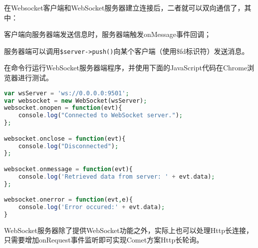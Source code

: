 在Websocket客户端和WebSocket服务器建立连接后，二者就可以双向通信了，其中：

\begin{compactitem}
\item 客户端向服务器端发送信息时，服务器端触发onMessage事件回调；
\item 服务器端可以调用\texttt{\$server->push()}向某个客户端（使用\$fd标识符）发送消息。
\end{compactitem}

在命令行运行WebSocket服务器端程序，并使用下面的JavaScript代码在Chrome浏览器进行测试。

\begin{lstlisting}[language=PHP]
var wsServer = 'ws://0.0.0.0:9501';
var websocket = new WebSocket(wsServer);
websocket.onopen = function(evt){
	console.log("Connected to WebSocket server.");
};

websocket.onclose = function(evt){
	console.log("Disconnected");
};

websocket.onmessage = function(evt){
	console.log('Retrieved data from server: ' + evt.data);
};

websocket.onerror = function(evt,e){
	console.log('Error occured:' + evt.data);
}
\end{lstlisting}

WebSocket服务器除了提供WebSocket功能之外，实际上也可以处理Http长连接，只需要增加onRequest事件监听即可实现Comet方案Http长轮询。

\begin{lstlisting}[language=PHP]

\end{lstlisting}


\begin{lstlisting}[language=PHP]

\end{lstlisting}






\begin{lstlisting}[language=PHP]

\end{lstlisting}



\begin{lstlisting}[language=PHP]

\end{lstlisting}



\begin{lstlisting}[language=PHP]

\end{lstlisting}





